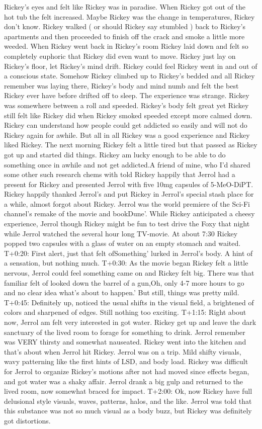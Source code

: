 \documentclass[12pt]{book}
\begin{document}
Rickey's eyes and felt like Rickey was in paradise. When Rickey got out of the hot tub the felt increased. Maybe Rickey was the change in temperatures, Rickey don't know. Rickey walked ( or should Rickey say stumbled ) back to Rickey's apartments and then proceeded to finish off the crack and smoke a little more weeded. When Rickey went back in Rickey's room Rickey laid down and felt so completely euphoric that Rickey did even want to move. Rickey just lay on Rickey's floor, let Rickey's mind drift. Rickey could feel Rickey went in and out of a conscious state. Somehow Rickey climbed up to Rickey's bedded and all Rickey remember was laying there, Rickey's body and mind numb and felt the best Rickey ever have before drifted off to sleep. The experience was strange. Rickey was somewhere between a roll and speeded. Rickey's body felt great yet Rickey still felt like Rickey did when Rickey smoked speeded except more calmed down. Rickey can understand how people could get addicted so easily and will not do Rickey again for awhile. But all in all Rickey was a good experience and Rickey liked Rickey. The next morning Rickey felt a little tired but that passed as Rickey got up and started did things. Rickey am lucky enough to be able to do something once in awhile and not get addicted.A friend of mine, who I'd shared some other such research chems with told Rickey happily that Jerrol had a present for Rickey and presented Jerrol with five 10mg capsules of 5-MeO-DiPT. Rickey happily thanked Jerrol's and put Rickey in Jerrol's special stash place for a while, almost forgot about Rickey. Jerrol was the world premiere of the Sci-Fi channel's remake of the movie and bookDune'. While Rickey anticipated a cheesy experience, Jerrol though Rickey might be fun to test drive the Foxy that night while Jerrol watched the several hour long TV-movie. At about 7:30 Rickey popped two capsules with a glass of water on an empty stomach and waited. T+0:20: First alert, just that felt ofSomething' lurked in Jerrol's body. A hint of a sensation, but nothing much. T+0:30: As the movie began Rickey felt a little nervous, Jerrol could feel something came on and Rickey felt big. There was that familiar felt of looked down the barrel of a gun,Oh, only 4-7 more hours to go and no clear idea what's about to happen.' But still, things was pretty mild. T+0:45: Definitely up, noticed the usual shifts in the visual field, a brightened of colors and sharpened of edges. Still nothing too exciting. T+1:15: Right about now, Jerrol am felt very interested in got water. Rickey get up and leave the dark sanctuary of the lived room to forage for something to drink. Jerrol remember was VERY thirsty and somewhat nauseated. Rickey went into the kitchen and that's about when Jerrol hit Rickey. Jerrol was on a trip. Mild shifty visuals, wavy patterning like the first hints of LSD, and body load. Rickey was difficult for Jerrol to organize Rickey's motions after not had moved since effects began, and got water was a shaky affair. Jerrol drank a big gulp and returned to the lived room, now somewhat braced for impact. T+2:00: Ok, now Rickey have full delusional style visuals, waves, patterns, halos, and the like. Jerrol was told that this substance was not so much visual as a body buzz, but Rickey was definitely got distortions. 
\end{document}
